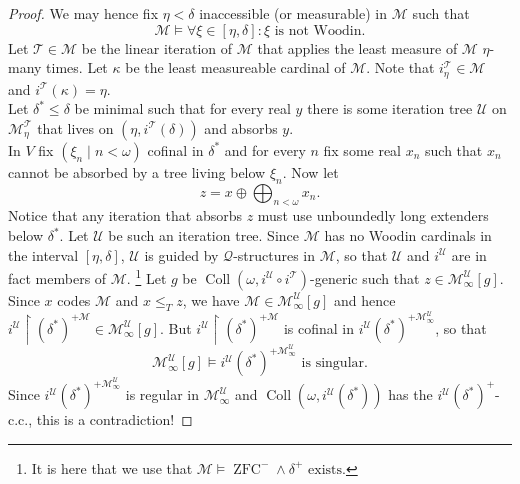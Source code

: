 \documentclass[12pt,a4paper]{article}
\theoremstyle{nicestyle}
\DeclareMathOperator{\zfc}{ZFC}
\DeclareMathOperator{\coll}{Coll}
\begin{document}
\begin{proof}
  We may hence fix $\eta < \delta$ inaccessible (or measurable) in
  $\mathcal{M}$ such that
  \[
    \mathcal{M} \models \forall \xi \in [\eta, \delta] \colon \xi
    \text{ is not Woodin}.
  \]
  Let $\mathcal{T} \in \mathcal{M}$ be the linear iteration of
  $\mathcal{M}$ that applies the least measure of $\mathcal{M}$
  $\eta$-many times. Let $\kappa$ be the least measureable cardinal of
  $\mathcal{M}$. Note that $i^{\mathcal{T}}_{\eta} \in \mathcal{M}$
  and $i^{\mathcal{T}}(\kappa) = \eta$. \\
  Let $\delta^{*} \le \delta$ be minimal such that for every real $y$
  there is some iteration tree $\mathcal{U}$ on
  $\mathcal{M}^{\mathcal{T}}_{\eta}$ that lives on
  $(\eta, i^{\mathcal{T}}(\delta))$ and absorbs $y$. \\
  In $V$ fix $(\xi_{n} \mid n < \omega)$ cofinal in $\delta^{*}$ and
  for every $n$ fix some real $x_{n}$ such that $x_{n}$ cannot be
  absorbed by a tree living below $\xi_{n}$. Now let
  \[
    z = x \oplus \bigoplus_{n < \omega} x_{n}.
  \]
  Notice that any iteration that absorbs $z$ must use unboundedly long
  extenders below $\delta^{*}$. Let $\mathcal{U}$ be such an iteration
  tree. Since $\mathcal{M}$ has no Woodin cardinals in the interval
  $[\eta, \delta]$, $\mathcal{U}$ is guided by
  $\mathcal{Q}$-structures in $\mathcal{M}$, so that $\mathcal{U}$ and
  $i^{\mathcal{U}}$ are in fact members of $\mathcal{M}$. \footnote{It
    is here that we use that
    $\mathcal{M} \models \zfc^{-} \wedge \delta^{+} \text{ exists}$.}
  Let $g$ be
  $\coll(\omega,i^{\mathcal{U}} \circ i^{\mathcal{T}})$-generic such
  that $z \in \mathcal{M}^{\mathcal{U}}_{\infty}[g]$. Since $x$ codes
  $\mathcal{M}$ and $x \le_{T} z$, we have
  $\mathcal{M} \in \mathcal{M}^{\mathcal{U}}_{\infty}[g]$ and hence
  $i^{\mathcal{U}} \restriction (\delta^{*})^{+\mathcal{M}} \in
  \mathcal{M}^{\mathcal{U}}_{\infty}[g]$. But
  $i^{\mathcal{U}} \restriction
  (\delta^{*})^{+\mathcal{M}}$ is cofinal in
  $i^{\mathcal{U}}(\delta^{*})^{+
    \mathcal{M}^{\mathcal{U}}_{\infty}}$, so that
  \[
    \mathcal{M}^{\mathcal{U}}_{\infty}[g] \models i^{\mathcal{U}}(\delta^{*})^{+
    \mathcal{M}^{\mathcal{U}}_{\infty}} \text{ is singular}.
  \]
  Since $i^{\mathcal{U}}(\delta^{*})^{+ \mathcal{M}^{\mathcal{U}}_{\infty}}$ is
    regular in $\mathcal{M}^{\mathcal{U}}_{\infty}$ and
    $\coll(\omega, i^{\mathcal{U}}(\delta^{*}))$ has the
    $i^{\mathcal{U}}(\delta^{*})^{+}$-c.c., this is a contradiction!
\end{proof}
\end{document}
